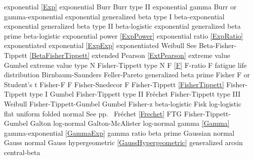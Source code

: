 exponential 					\dotfill	\eqref{Exp} 						\ncite	%
exponential Burr				\dotfill	Burr type II 						\ncite	%
exponential gamma				\dotfill	Burr or gamma-exponential		  		%
exponential generalized beta type I 	\dotfill	beta-exponential			 	%
exponential generalized beta type II 	\dotfill	beta-logistic				 	%
exponential generalized beta prime 	\dotfill	beta-logistic					\ncite	%
exponential power				\dotfill	\eqref{ExpPower}					\ncite
exponential ratio				\dotfill	\eqref{ExpRatio}					\ncite	%
exponentiated exponential		\dotfill	\eqref{ExpExp}						\ncite	%
exponentiated Weibull 			\dotfill	See Beta-Fisher-Tippett \eqref{BetaFisherTippett}\ncite	%
extended Pearson				\dotfill	\eqref{ExtPearson}					\ncite
extreme value					\dotfill	Gumbel 								\ncite
extreme value type N 			\dotfill	Fisher-Tippett type N 				\ncite	%
%
F								\dotfill	\eqref{F} 							\ncite	%
F-ratio							\dotfill	F									\ncite	%
fatigue life distribution		\dotfill	Birnbaum-Saunders					\ncite
Feller-Pareto					\dotfill	generalized beta prime 				\ncite	%
Fisher							\dotfill	F or Student's t 					\ncite	%
Fisher-F 						\dotfill	F 									\ncite	%
Fisher-Snedecor 				\dotfill	F 									\ncite	%
Fisher-Tippett					\dotfill	\eqref{FisherTippett} 				\ncite	%
Fisher-Tippett type I			\dotfill	Gumbel 								\ncite	%
Fisher-Tippett type II			\dotfill	Fr\'{e}chet  						\ncite	%
Fisher-Tippett type III			\dotfill	Weibull 							\ncite	%
Fisher-Tippett-Gumbel			\dotfill	Gumbel  							\ncite	%
Fisher-z						\dotfill	beta-logistic						\ncite	%
Fisk							\dotfill	log-logistic						\ncite 	%
flat 							\dotfill	uniform 							\ncite	%
folded normal					\dotfill    See pp.~\pageref{FoldedNormal}		\ncite
Fr\'{e}chet 					\dotfill	\eqref{Frechet} 					\ncite	%
FTG								\dotfill	Fisher-Tippett-Gumbel 				\ncite	%
%
Galton							\dotfill	log-normal 							\ncite	%
Galton-McAlister				\dotfill	log-normal 							\ncite	%
gamma							\dotfill	\eqref{Gamma} 						\ncite	%
gamma-exponential				\dotfill	\eqref{GammaExp}					\ncite	%
gamma ratio						\dotfill	beta prime							\ncite	%
Gaussian 						\dotfill	normal 								\ncite	%
Gauss 							\dotfill	normal 								\ncite	%
Gauss hypergeometric			\dotfill	\eqref{GaussHypergeometric}			\ncite
generalized arcsin				\dotfill	central-beta	 					   	%

